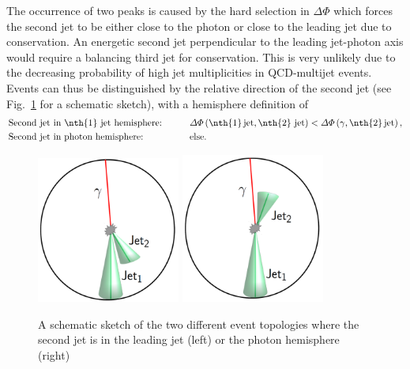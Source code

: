 The occurrence of two peaks is caused by the hard selection in $\Delta \Phi$ which forces the second jet to be either close to the photon or close to the leading jet due to \pt conservation. 
An energetic second jet perpendicular to the leading jet-photon axis would require a balancing third jet for \pt conservation.
This is very unlikely due to the decreasing probability of high jet multiplicities in QCD-multijet events.
Events can thus be distinguished by the relative direction of the second jet (see Fig.~\ref{fig:sketch} for a schematic sketch), with a hemisphere definition of
\begin{equation}\label{eq:HemisphereDefinition}
\begin{aligned}
  &\text{Second jet in \nth{1} jet hemisphere:}  \qquad  && \Delta \Phi \left( \text{\nth{1}\,jet,\,\nth{2} jet} \right) < \Delta \Phi \left( \gamma \text{,\,\nth{2}\,jet} \right) , \\
  &\text{Second jet in photon hemisphere:}        && \text{else}.\\
\end{aligned}
\end{equation}
\begin{figure}[!b]
 \centering
 \vspace{30pt}
     \includegraphics[width=0.42\textwidth]{figures/resolution/methodology/2ndJet_in_JetHemisphere.pdf}
     \hspace{0.1\textwidth}
     \includegraphics[width=0.42\textwidth]{figures/resolution/methodology/2ndJet_in_PhotonHemisphere.pdf}
  \caption{A schematic sketch of the two different event topologies where the second jet is in the leading jet (left) or the photon hemisphere (right)}  
 \label{fig:sketch}
\end{figure}

